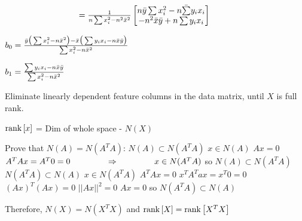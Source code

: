 \documentclass[12pt]{article}
\begin{document}
\begin{enumerate}
$ \hspace*{3.1cm} = \frac{1}{n\sum x_i^2 -n^2 \xbar^2} \begin{bmatrix}
n \ybar \sum x_i^2 -n \bar \sum y_i x_i \\
-n^2 \xbar \ybar +n \sum y_i x_i 
\end{bmatrix}$ \newline 

$b_0 = \frac{\bar{y} \big( \sum x_i ^2 -n \bar{x}^2 \big) - \bar{x} \big( \sum y_i x_i -n \bar{x} \bar{y} \big)}{\sum x_i^2 -n \bar{x}^2}$ \newline 

$b_1 = \frac{\sum y_i x_i - n \bar{x} \bar{y}}{\sum x_i^2 -n \bar{x}^2}$ \newline 


    
    

 

Eliminate linearly dependent feature columns in the data matrix, until $X$ is full rank. 


$\text{rank}\left[x\right]$ = Dim of whole space - $N(X)$ \newline 

Prove that $N(A) = N(A^TA)$: \newline 
$ N(A) \subset N(A^T A)$ \newline 
$ x \in N(A)$ \newline 
$Ax = 0$ \newline 
$A^T A x = A^T 0 = 0 \hspace*{1.5cm} \Rightarrow \hspace*{1.5cm} x\in N(A^TA)$ \newline 
so $ N(A) \subset N(A^T A)$ \newline 
$N(A^TA) \subset N(A)$ \newline 
$x \in N(A^T A)$ \newline 
$A^T Ax = 0$ \newline 
$x^T A^T a x = x^T 0 = 0$ \newline 
$(Ax)^T (Ax) =0$ \newline 
$ \vert \vert Ax \vert \vert^2 = 0$ \newline 
$Ax = 0$ \newline 
so $N(A^T A) \subset N(A)$ \newline 

Therefore, $N(X) = N(X^T X)$ and $\text{rank}\left[X\right] = \text{rank}\left[X^T X\right]$





\end{enumerate}
\end{document}
